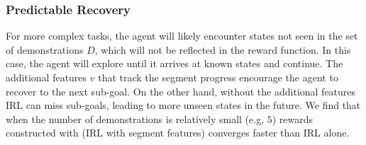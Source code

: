 \subsubsection{Predictable Recovery} For more complex tasks, the agent will likely encounter states not seen in the set of demonstrations $D$, which will not be reflected in the reward function. In this case, the agent will explore until it arrives at known states and continue.
The additional features $v$ that track the segment progress encourage the agent to recover to the next sub-goal.
On the other hand, without the additional features IRL can miss sub-goals, leading to more unseen states in the future.
We find that when the number of demonstrations is relatively small (e.g, $5$) rewards constructed with \tsh (IRL with segment features) converges faster than IRL alone.


%